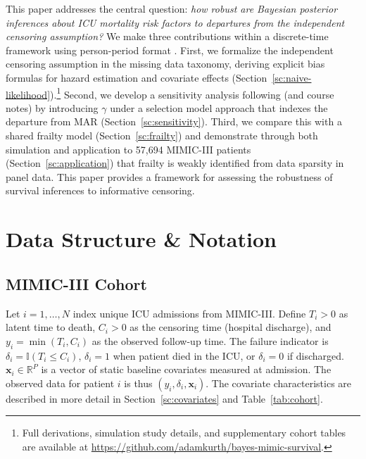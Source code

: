 \documentclass[twoside,11pt]{article}
\newcommand{\ind}{\mathbb{I}}
\newcommand{\bx}{\mathbf{x}}
\begin{document}
This paper addresses the central question: \emph{how robust are Bayesian posterior inferences about ICU mortality risk factors to departures from the independent censoring assumption?} We make three contributions within a discrete-time framework using person-period format \citep{allison-discrete}. First, we formalize the independent censoring assumption in the missing data taxonomy, deriving explicit bias formulas for hazard estimation and covariate effects (Section~\ref{sc:naive-likelihood}).\footnote{Full derivations, simulation study details, and supplementary cohort tables are available at \url{https://github.com/adamkurth/bayes-mimic-survival}.} Second, we develop a sensitivity analysis following \citet{scharfstein1999} (and course notes) by introducing $\gamma$ under a selection model approach that indexes the departure from MAR (Section~\ref{sc:sensitivity}). Third, we compare this with a shared frailty model (Section~\ref{sc:frailty}) and demonstrate through both simulation and application to 57,694 MIMIC-III patients (Section~\ref{sc:application}) that frailty is weakly identified from data sparsity in panel data. This paper provides a framework for assessing the robustness of survival inferences to informative censoring.

\section{Data Structure \& Notation}\label{sc:notation}
\subsection{MIMIC-III Cohort}\label{sc:cohort}
Let $i = 1, \dots, N$ index unique ICU admissions from MIMIC-III. Define \(T_i > 0\) as latent time to death, \(C_i > 0 \) as the censoring time (hospital discharge), and \(y_i = \min(T_i, C_i)\) as the observed follow-up time. The failure indicator is \(\delta_i = \ind(T_i \le C_i)\), \(\delta_i = 1\) when patient died in the ICU, or \(\delta_i = 0\) if discharged. \(\bx_i \in \mathbb{R}^P\) is a vector of static baseline covariates measured at admission. The observed data for patient \(i\) is thus \((y_i, \delta_i, \bx_i)\). The covariate characteristics are described in more detail in Section~\ref{sc:covariates} and Table~\ref{tab:cohort}.
 
 
\end{document}
